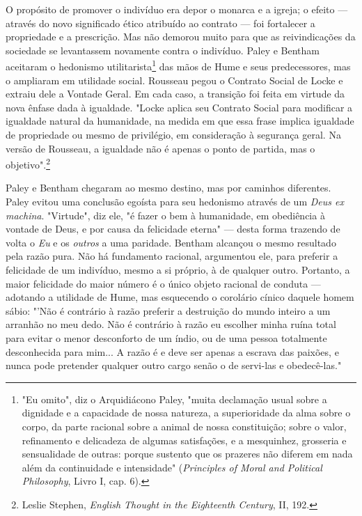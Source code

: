 \documentclass[12pt]{article}
\begin{document}
O propósito de promover o indivíduo era depor o monarca e a igreja; o efeito — através do novo significado ético atribuído ao contrato — foi fortalecer a propriedade e a prescrição. Mas não demorou muito para que as reivindicações da sociedade se levantassem novamente contra o indivíduo. Paley e Bentham aceitaram o hedonismo utilitarista\footnote{"Eu omito", diz o Arquidiácono Paley, "muita declamação usual sobre a dignidade e a capacidade de nossa natureza, a superioridade da alma sobre o corpo, da parte racional sobre a animal de nossa constituição; sobre o valor, refinamento e delicadeza de algumas satisfações, e a mesquinhez, grosseria e sensualidade de outras: porque sustento que os prazeres não diferem em nada além da continuidade e intensidade" (\textit{Principles of Moral and Political Philosophy}, Livro I, cap. 6).} das mãos de Hume e seus predecessores, mas o ampliaram em utilidade social. Rousseau pegou o Contrato Social de Locke e extraiu dele a Vontade Geral. Em cada caso, a transição foi feita em virtude da nova ênfase dada à igualdade. "Locke aplica seu Contrato Social para modificar a igualdade natural da humanidade, na medida em que essa frase implica igualdade de propriedade ou mesmo de privilégio, em consideração à segurança geral. Na versão de Rousseau, a igualdade não é apenas o ponto de partida, mas o objetivo".\footnote{Leslie Stephen, \textit{English Thought in the Eighteenth Century}, II, 192.}

Paley e Bentham chegaram ao mesmo destino, mas por caminhos diferentes. Paley evitou uma conclusão egoísta para seu hedonismo através de um \textit{Deus ex machina}. "Virtude", diz ele, "é fazer o bem à humanidade, em obediência à vontade de Deus, e por causa da felicidade eterna" — desta forma trazendo de volta o \textit{Eu} e os \textit{outros} a uma paridade. Bentham alcançou o mesmo resultado pela razão pura. Não há fundamento racional, argumentou ele, para preferir a felicidade de um indivíduo, mesmo a si próprio, à de qualquer outro. Portanto, a maior felicidade do maior número é o único objeto racional de conduta — adotando a utilidade de Hume, mas esquecendo o corolário cínico daquele homem sábio: "'Não é contrário à razão preferir a destruição do mundo inteiro a um arranhão no meu dedo. Não é contrário à razão eu escolher minha ruína total para evitar o menor desconforto de um índio, ou de uma pessoa totalmente desconhecida para mim... A razão é e deve ser apenas a escrava das paixões, e nunca pode pretender qualquer outro cargo senão o de servi-las e obedecê-las."
\end{document}
